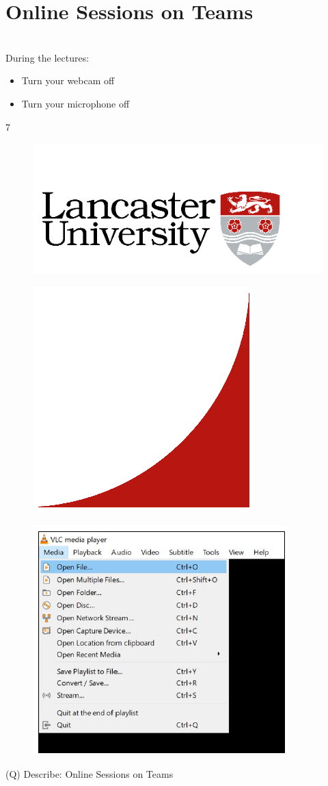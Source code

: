 \documentclass[12pt]{article}
\begin{document}
\section{Online Sessions on Teams}
\\
During the lectures:\\
\begin{itemize}
  \item Turn your webcam off
  \item Turn your microphone off
\end{itemize}
7\\
\begin{figure}[H]
\includegraphics[width=0.5\linewidth]{page1-image-1.png}
\end{figure}
\begin{figure}[H]
\includegraphics[width=0.5\linewidth]{page1-image-2.png}
\end{figure}
\begin{figure}[H]
\includegraphics[width=0.5\linewidth]{page1-image-3.png}
\end{figure}
\clearpage
(Q)
Describe: Online Sessions on Teams
\clearpage
\end{document}
